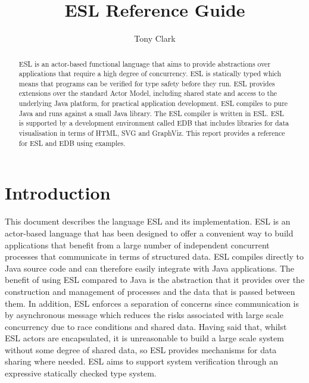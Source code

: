 \documentclass[5p,times]{elsarticle}
\begin{document}
\begin{frontmatter}


\title{ESL Reference Guide}

\author{Tony Clark}

\address{Aston University, Birmingham, UK}

\begin{abstract}
ESL is an actor-based functional language that aims to provide abstractions over applications that require a high degree of concurrency. ESL is statically typed which means that programs can be verified for type safety before they run. ESL provides extensions over the standard Actor Model, including shared state and access to the underlying Java platform, for practical application development. ESL compiles to pure Java and runs against a small Java library. The ESL compiler is written in ESL. ESL is supported by a development environment called EDB that includes libraries for data visualisation in terms of HTML, SVG and GraphViz. This report provides a reference for ESL and EDB using examples.
\end{abstract}

\end{frontmatter}


\tableofcontents

\section{Introduction}

\label{sec:introduction}

This document describes the language ESL and its implementation. ESL is an actor-based language that has been designed to offer a convenient way to build applications that benefit from a large number of independent concurrent processes that communicate in terms of structured data. ESL compiles directly to Java source code and can therefore easily integrate with Java applications. The benefit of using ESL compared to Java is the abstraction that it provides over the construction and management of processes and the data that is passed between them. In addition, ESL enforces a separation of concerns since communication is by asynchronous message which reduces the risks associated with large scale concurrency due to race conditions and shared data. Having said that, whilst ESL actors are encapsulated, it is unreasonable to build a large scale system without some degree of shared data, so ESL provides mechanisms for data sharing where needed. ESL aims to support system verification through an expressive statically checked type system.
\end{document}

